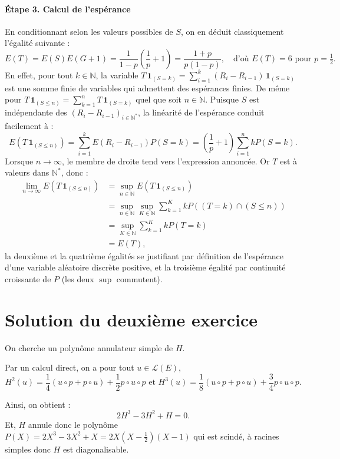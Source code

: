 \paragraph{Étape 3. Calcul de l'espérance}
En conditionnant selon les valeurs possibles de $S$, on en déduit classiquement l'égalité suivante :
\[
E(T) = E(S)E(G+1) = \frac1{1-p}\left(\frac1p+1\right) = \frac{1+p}{p(1-p)},\quad\text{d'où }  E(T) = 6 \text{ pour } p=\tfrac12.
\]
En effet, pour tout $k \in \mathbb N$, la variable $T\,\mathbf 1_{(S=k)} = \sum_{i=1}^k (R_i-R_{i-1})\,\mathbf 1_{(S=k)}$ est une somme finie de variables qui admettent des espérances finies. De même pour $T \,\mathbf 1_{(S\leqslant n)} = \sum_{k=1}^n T\,\mathbf 1_{(S=k)}$ quel que soit $n \in \mathbb N$. Puisque $S$ est indépendante des $(R_i - R_{i-1})_{i\in\mathbb N^*}$, la linéarité de l'espérance conduit facilement à :
\[
E(T\,\mathbf 1_{(S \leqslant n)}) = \sum_{i=1}^k E(R_i-R_{i-1}) P(S=k) = \left(\frac1{p}+1\right)\sum_{i=1}^n k P(S=k).
\]
Lorsque $n \to \infty$, le membre de droite tend vers l'expression annoncée. Or $T$ est à valeurs dans $\mathbb N^*$, donc :
\begin{align*}
\lim_{n\to \infty} E(T \,\mathbf 1_{(S\leqslant n)})
&= \sup_{n\in\mathbb N} E(T \,\mathbf 1_{(S\leqslant n)})\\
&= \sup_{n\in \mathbb N} \sup_{K \in \mathbb N} \sum_{k=1}^K kP((T=k) \cap (S\leqslant n))\\
& = \sup_{K \in \mathbb N} \sum_{k=1}^K kP(T=k)\\
& = E(T),
\end{align*}
la deuxième et la quatrième égalités se justifiant par définition de l'espérance d'une variable aléatoire discrète positive, et la troisième égalité par continuité croissante de $P$ (les deux $\sup$ commutent).


\section{Solution du deuxième exercice}

On cherche un polynôme annulateur simple de $H.$

Par un calcul direct, on a pour tout $u\in \mathcal{L}(E),$  $$H^{2}(u)=\frac{1}{4}(u\circ p+p\circ u)+\frac{1}{2}p\circ u \circ p \mbox{ et } 
H^{3}(u)=\frac{1}{8}(u\circ p+p\circ u)+\frac{3}{4}p\circ u \circ p.$$

Ainsi, on obtient : $$2H^{3}-3H^{2}+H=0.$$ 
Et, $H$ annule donc le polynôme $\displaystyle P(X)=2X^{3}-3X^{2}+X=2X(X-\frac{1}{2})(X-1)$ qui est scindé, à racines simples donc $H$ est diagonalisable.